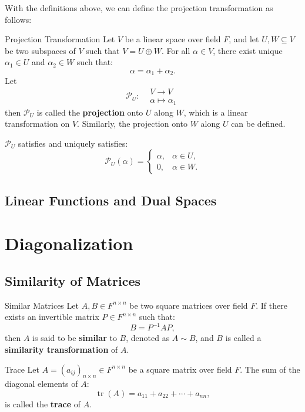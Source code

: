 \documentclass[11pt]{../../TexTemplate/elegantbook} %
\begin{document}
With the definitions above, we can define the projection transformation as follows:
\begin{definition}{Projection Transformation}
    Let \( V \) be a linear space over field \( F \),
    and let \( U, W \subseteq V \) be two subspaces of \( V \) such that \( V = U \oplus W \).
    For all \( \alpha \in V \), there exist unique \( \alpha_1 \in U \) and \( \alpha_2 \in W \) such that:
    \[
    \alpha = \alpha_1 + \alpha_2.
    \]
    Let
    \[ 
        \mathcal{P}_{U}: 
        \begin{aligned}
        &V \to V \\
        &\alpha \mapsto \alpha_1
        \end{aligned}
    \] 
    then \( \mathcal{P}_{U} \) is called the \textbf{projection} onto \( U \) along \( W \),
    which is a linear transformation on \( V \).
    Similarly, the projection onto \( W \) along \( U \) can be defined.
\end{definition}
\( \mathcal{P}_{U}\) satisfies and uniquely satisfies:
\[
\mathcal{P}_{U}( \alpha ) = 
\begin{cases} 
    \alpha, & \alpha \in U, \\ 
    0, & \alpha \in W .
\end{cases}
\]



\section{Linear Functions and Dual Spaces}



\chapter{Diagonalization}
\section{Similarity of Matrices}
\begin{definition}{Similar Matrices}
    Let \( A, B \in F^{n \times n} \) be two square matrices over field \( F \).
    If there exists an invertible matrix \( P \in F^{n \times n} \) such that:
    \[
    B = P^{-1} A P,
    \]
    then \( A \) is said to be \textbf{similar} to \( B \), denoted as \( A \sim B \),
    and \( B \) is called a \textbf{similarity transformation} of \( A \).
\end{definition}

\begin{definition}{Trace}
    Let \( A = (a_{ij})_{n \times n} \in F^{n \times n} \) be a square matrix over field \( F \).
    The sum of the diagonal elements of \( A \):
    \[
    \operatorname{tr}(A) = a_{11} + a_{22} + \cdots + a_{nn},
    \]
    is called the \textbf{trace} of \( A \).
\end{definition}
\end{document}
